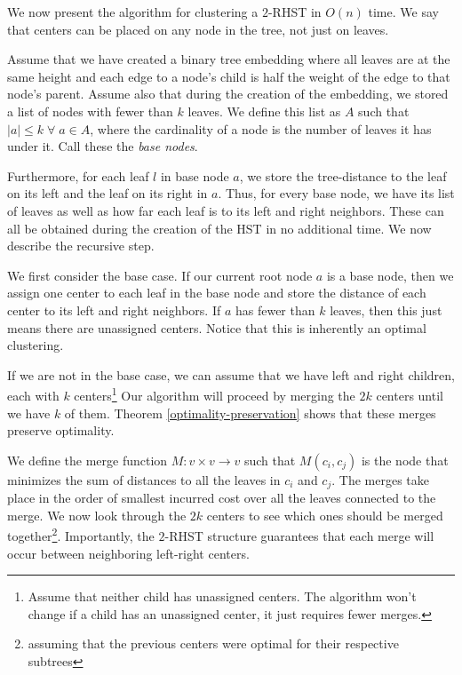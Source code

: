\documentclass{article}
\theoremstyle{definition}
\begin{document}
We now present the algorithm for clustering a $2$-RHST in $O(n)$ time. We say that centers can be placed on any node in the tree, not just on leaves.

Assume that we have created a binary tree embedding where all leaves are at the same height and each edge to a node's child is half the weight of the
edge to that node's parent. Assume also that during the creation of the embedding, we stored a list of nodes with fewer than $k$ leaves. We define this
list as $A$ such that $|a| \leq k \; \forall \; a \in A$, where the cardinality of a node is the number of leaves it has under it. Call these the
\emph{base nodes}.

Furthermore, for each leaf $l$ in base node $a$, we store the tree-distance to the leaf on its left and the leaf on its right in $a$.
Thus, for every base node, we have its list of leaves as well as how far each leaf is to its left and right neighbors. These can all be obtained
during the creation of the HST in no additional time. We now describe the recursive step.

We first consider the base case. If our current root node $a$ is a base node, then we assign one center to each leaf in the
base node and store the distance of each center to its left and right neighbors. If $a$ has fewer than $k$ leaves, then this just means there are unassigned
centers. Notice that this is inherently an optimal clustering.

If we are not in the base case, we can assume that we have left and right children, each with $k$ centers\footnote{Assume that neither child has
unassigned centers. The algorithm won't change if a child has an unassigned center, it just requires fewer merges.} Our algorithm will proceed by
merging the $2k$ centers until we have $k$ of them. Theorem \ref{optimality-preservation} shows that these merges preserve optimality.

We define the merge function $M : v \times v \rightarrow v$ such that $M(c_i, c_j)$ is the node that minimizes the sum of distances to all the leaves in
$c_i$ and $c_j$. The merges take place in the order of smallest incurred cost over all the leaves connected to the merge. We now look through the $2k$
centers to see which ones should be merged together\footnote{assuming that the previous centers were optimal for their respective subtrees}.
Importantly, the $2$-RHST structure guarantees that each merge will occur between neighboring left-right centers.
\end{document}
